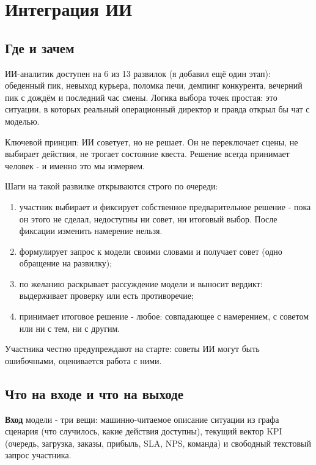 \documentclass[12pt,a4paper]{article}
\begin{document}
\section{Интеграция ИИ}

\subsection{Где и зачем}

ИИ-аналитик доступен на 6 из 13 развилок (я добавил ещё один этап): обеденный пик, невыход курьера, поломка печи, демпинг конкурента, вечерний пик с дождём и последний час смены. Логика выбора точек простая: это ситуации, в которых реальный операционный директор и правда открыл бы чат с моделью. 

Ключевой принцип: ИИ советует, но не решает. Он не переключает сцены, не выбирает действия, не трогает состояние квеста. Решение всегда принимает человек - и именно это мы измеряем.

Шаги на такой развилке открываются строго по очереди:

\begin{enumerate}[leftmargin=*]
    \item участник выбирает и фиксирует собственное предварительное решение - пока он этого не сделал, недоступны ни совет, ни итоговый выбор. После фиксации изменить намерение нельзя.
    \item формулирует запрос к модели своими словами и получает совет (одно обращение на развилку);
    \item по желанию раскрывает рассуждение модели и выносит вердикт: выдерживает проверку или есть противоречие;
    \item принимает итоговое решение - любое: совпадающее с намерением, с советом или ни с тем, ни с другим.
\end{enumerate}

 Участника честно предупреждают на старте: советы ИИ могут быть ошибочными, оценивается работа с ними.

\subsection{Что на входе и что на выходе}

\textbf{Вход} модели - три вещи: машинно-читаемое описание ситуации из графа сценария (что случилось, какие действия доступны), текущий вектор KPI (очередь, загрузка, заказы, прибыль, SLA, NPS, команда) и свободный текстовый запрос участника.
\end{document}
